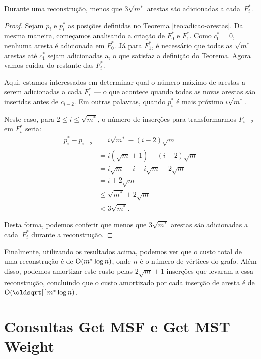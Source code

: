 \begin{theorem}
    \label{teo:deslocamento}
    Durante uma reconstrução, menos que $3 \sqrt{m^*}$ arestas são adicionadas a cada~$F_i^*$.
\end{theorem}
\begin{proof}
    Sejam $p_i$ e $p_i^*$ as posições definidas no Teorema \ref{teo:adicao-arestas}. Da mesma maneira, começamos analisando a criação de $F_0^*$ e $F_1^*$. Como $c_0^* = 0$, nenhuma aresta é adicionada em $F_0^*$. Já para $F_1^*$, é necessário que todas as $\sqrt{m^*}$ arestas até $c_1^*$ sejam adicionadas a, o que satisfaz a definição do Teorema. Agora vamos cuidar do restante das $F_i^*$.

    Aqui, estamos interessados em determinar qual o número máximo de arestas a serem adicionadas a cada $F_i^*$ --- o que acontece quando todas as novas arestas são inseridas antes de $c_{i-2}$. Em outras palavras, quando $p_i^*$ é mais próximo $i \sqrt{m^*}$.

    Neste caso, para $2 \leq i \leq \sqrt{m^*}$, o número de inserções para transformarmos $F_{i-2}$ em $F_i^*$ seria:
    \begin{align*}
        p_i^* - p_{i-2} & = i\sqrt{m^*} - (i-2)\sqrt{m}           \\
                        & = i(\sqrt{m}+1) - (i-2)\sqrt{m}         \\
                        & = i\sqrt{m} + i - i\sqrt{m} + 2\sqrt{m} \\
                        & = i + 2\sqrt{m}                         \\
                        & \leq \sqrt{m^*} + 2\sqrt{m}             \\
                        & < 3\sqrt{m^*}.
    \end{align*}

    Desta forma, podemos conferir que menos que $3 \sqrt{m^*}$ arestas são adicionadas a cada~$F_i^*$ durante a reconstrução.
\end{proof}

Finalmente, utilizando os resultados acima, podemos ver que o custo total de uma reconstrução é de $\mathrm{O}(m^* \log{n})$, onde $n$ é o número de vértices do grafo. Além disso, podemos amortizar este custo pelas $2\sqrt{m} + 1$ inserções que levaram a essa reconstrução, concluindo que o custo amortizado por cada inserção de aresta é de $\Oh(\sqrt{m^*} \log{n})$.

\section{Consultas Get MSF e Get MST Weight}
\label{sec:rmsf-get-msf}

